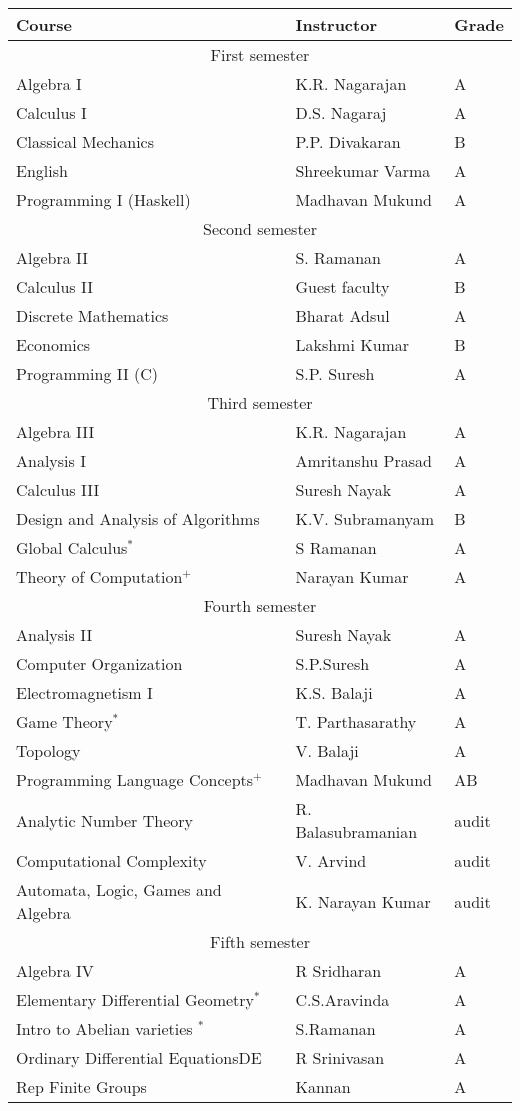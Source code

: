 \documentclass[12pt,a4paper,oneside]{amsart}
\begin{document}
\vspace{0.25in}
\begin{tabular}{|l|l|l|}
  \hline
  Course & Instructor & Grade \\
  \hline
  \multicolumn{3}{|c|}{First semester}\\
  \hline
  Algebra I & K.R. Nagarajan & A \\
  Calculus I & D.S. Nagaraj & A \\
  Classical Mechanics & P.P. Divakaran & B\\
  English & Shreekumar Varma & A\\
  Programming I (Haskell) & Madhavan Mukund & A \\
  \hline
  \multicolumn{3}{|c|}{Second semester}\\
  \hline
  Algebra II & S. Ramanan & A \\
  Calculus II & Guest faculty & B \\
  Discrete Mathematics & Bharat Adsul & A\\
  Economics & Lakshmi Kumar & B\\
  Programming II (C) & S.P. Suresh & A \\
  \hline
  \multicolumn{3}{|c|}{Third semester}\\
  \hline
  Algebra III & K.R. Nagarajan & A\\
  Analysis I & Amritanshu Prasad & A\\
  Calculus III& Suresh Nayak & A\\
  Design and Analysis of Algorithms & K.V. Subramanyam & B\\
  Global Calculus$^*$ & S Ramanan & A\\
  Theory of Computation$^+$ & Narayan Kumar & A\\
  \hline
  \multicolumn{3}{|c|}{Fourth semester}\\
  \hline
  Analysis II & Suresh Nayak & A\\
  Computer Organization & S.P.Suresh & A\\
  Electromagnetism I & K.S. Balaji & A\\
  Game Theory$^*$ & T. Parthasarathy & A\\
  Topology & V. Balaji & A\\
  Programming Language Concepts$^+$ & Madhavan Mukund & AB\\
  Analytic Number Theory & R. Balasubramanian & audit\\
  Computational Complexity & V. Arvind & audit\\
  Automata, Logic, Games and Algebra & K. Narayan Kumar & audit\\
  \hline
  \multicolumn{3}{|c|}{Fifth semester}\\
  \hline
  Algebra IV & R Sridharan & A\\
  Elementary Differential Geometry$^*$ & C.S.Aravinda &A\\
  Intro to Abelian varieties $^*$ & S.Ramanan & A\\
  Ordinary Differential EquationsDE & R Srinivasan & A\\
  Rep Finite Groups & Kannan & A\\
  \hline
\end{tabular}
\end{document}
